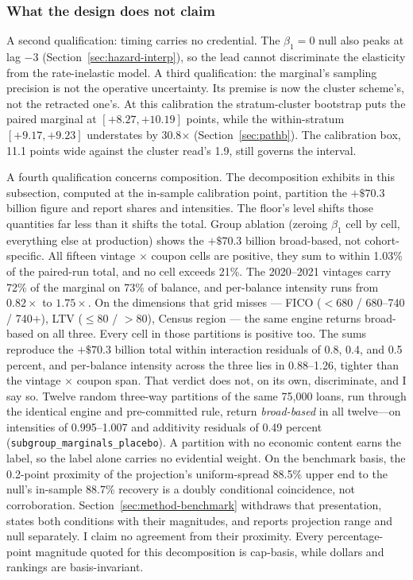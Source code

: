 \documentclass[12pt]{article}
\begin{document}
\subsubsection{What the design does not claim}

A second qualification: timing carries no credential. The $\beta_1 = 0$ null also peaks at lag $-3$ (Section~\ref{sec:hazard-interp}), so the lead cannot discriminate the elasticity from the rate-inelastic model. A third qualification: the marginal's sampling precision is not the operative uncertainty. Its premise is now the cluster scheme's, not the retracted one's. At this calibration the stratum-cluster bootstrap puts the paired marginal at $[+8.27, +10.19]$ points, while the within-stratum $[+9.17, +9.23]$ understates by 30.8$\times$ (Section~\ref{sec:pathb}). The calibration box, 11.1 points wide against the cluster read's 1.9, still governs the interval.

A fourth qualification concerns composition. The decomposition exhibits in this subsection, computed at the in-sample calibration point, partition the $+\$70.3$ billion figure and report shares and intensities. The floor's level shifts those quantities far less than it shifts the total. Group ablation (zeroing $\beta_1$ cell by cell, everything else at production) shows the $+\$70.3$ billion broad-based, not cohort-specific. All fifteen vintage $\times$ coupon cells are positive, they sum to within 1.03\% of the paired-run total, and no cell exceeds 21\%. The 2020--2021 vintages carry 72\% of the marginal on 73\% of balance, and per-balance intensity runs from $0.82\times$ to $1.75\times$. On the dimensions that grid misses --- FICO ($<$680 / 680--740 / 740$+$), LTV ($\leq$80 / $>$80), Census region --- the same engine returns broad-based on all three. Every cell in those partitions is positive too. The sums reproduce the $+\$70.3$ billion total within interaction residuals of 0.8, 0.4, and 0.5 percent, and per-balance intensity across the three lies in 0.88--1.26, tighter than the vintage $\times$ coupon span. That verdict does not, on its own, discriminate, and I say so. Twelve random three-way partitions of the same 75,000 loans, run through the identical engine and pre-committed rule, return \emph{broad-based} in all twelve---on intensities of 0.995--1.007 and additivity residuals of 0.49 percent (\texttt{subgroup\_marginals\_placebo}). A partition with no economic content earns the label, so the label alone carries no evidential weight. On the benchmark basis, the 0.2-point proximity of the projection's uniform-spread 88.5\% upper end to the null's in-sample 88.7\% recovery is a doubly conditional coincidence, not corroboration. Section~\ref{sec:method-benchmark} withdraws that presentation, states both conditions with their magnitudes, and reports projection range and null separately. I claim no agreement from their proximity. Every percentage-point magnitude quoted for this decomposition is cap-basis, while dollars and rankings are basis-invariant.
\end{document}
